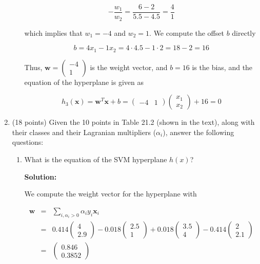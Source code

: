 \documentclass[11pt]{article}
\begin{document}
\begin{enumerate}
\begin{enumerate}
\begin{equation*}
-\frac{w_1}{w_2} = \frac{6-2}{5.5-4.5} = \frac{4}{1}
\end{equation*}

which implies that $w_1 = -4$ and $w_2 = 1$. We compute the offset $b$ directly

\begin{equation*}
b = 4 x_1 - 1 x_2 = 4 \cdot 4.5 - 1 \cdot 2 = 18 - 2 = 16
\end{equation*}

Thus, $\mathbf{w} = \left( \begin{array}{c} -4 \\ 1 \end{array} \right)$ is the weight vector, and $b = 16$ is the bias, and the equation of the hyperplane is given as

\begin{equation*}
h_3(\mathbf{x}) = \mathbf{w}^\mathit{T} \mathbf{x} + b = (\begin{array}{cc} -4 & 1 \end{array}) \left( \begin{array}{c} x_1 \\ x_2 \end{array} \right) + 16 = 0
\end{equation*}

\end{enumerate}

\item (18 points) Given the 10 points in Table 21.2 (shown in the text), along with their classes and their Lagranian multipliers ($\alpha_i$), answer the following questions:

\begin{enumerate}
\item What is the equation of the SVM hyperplane $h(x)$?

\textbf{Solution:}

We compute the weight vector for the hyperplane with

\begin{eqnarray*}
\mathbf{w} &=& \sum\limits_{i,\alpha_i > 0} \alpha_i y_i \mathbf{x}_i \\
&=& 0.414 \left( \begin{array}{c} 4 \\ 2.9 \end{array} \right) 
-0.018 \left( \begin{array}{c} 2.5 \\ 1 \end{array} \right)
+0.018 \left( \begin{array}{c} 3.5 \\ 4 \end{array} \right)
-0.414 \left( \begin{array}{c} 2 \\ 2.1 \end{array} \right) \\
&=& \left( \begin{array}{c} 0.846 \\ 0.3852 \end{array} \right)
\end{eqnarray*}


\end{enumerate}
\end{enumerate}
\end{document}
